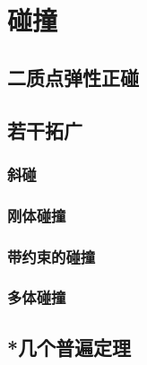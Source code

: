 

\section{碰撞}\label{3-6}

\subsection{二质点弹性正碰}\label{3-6-1}

\subsection{若干拓广}\label{3-6-2}

\subsubsection{斜碰}\label{3-6-2-1}

\subsubsection{刚体碰撞}\label{3-6-2-2}

\subsubsection{带约束的碰撞}\label{3-6-2-3}

\subsubsection{多体碰撞}\label{3-6-2-3}

\subsection{*几个普遍定理}\label{3-6-3}